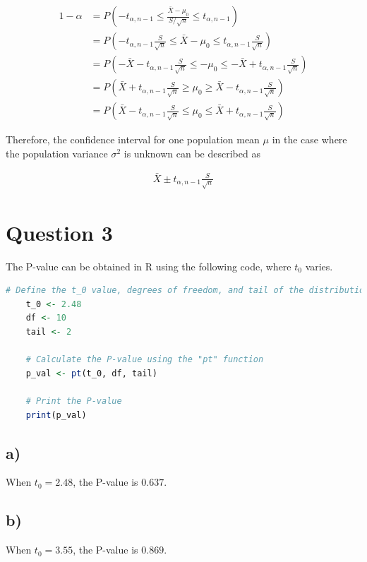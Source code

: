 \documentclass{article}
\begin{document}
\begin{align*}
    1 - \alpha &= P(-t_{\alpha,n-1} \leq \frac{\bar{X} - \mu_0}{S/\sqrt{n}} \leq t_{\alpha,n-1}) \\
                &= P(-t_{\alpha,n-1} \frac{S}{\sqrt{n}} \leq \bar{X} - \mu_0 \leq t_{\alpha,n-1} \frac{S}{\sqrt{n}}) \\
                &= P(-\bar{X} - t_{\alpha,n-1} \frac{S}{\sqrt{n}} \leq -\mu_0 \leq -\bar{X} + t_{\alpha,n-1} \frac{S}{\sqrt{n}}) \\
                &= P(\bar{X} + t_{\alpha,n-1} \frac{S}{\sqrt{n}} \geq \mu_0 \geq \bar{X} - t_{\alpha,n-1} \frac{S}{\sqrt{n}}) \\
                &= P(\bar{X} - t_{\alpha,n-1} \frac{S}{\sqrt{n}} \leq \mu_0 \leq \bar{X} + t_{\alpha,n-1} \frac{S}{\sqrt{n}})
    \end{align*}

Therefore, the confidence interval for one population mean $\mu$ in the case
where the population variance $\sigma ^{2}$ is unknown can be described as

\begin{align*}
    \bar{X} \pm t_{\alpha,n-1}\frac{S}{\sqrt{n}}
\end{align*}

\section*{Question 3}
The P-value can be obtained in R using the following code, where $t_0$ varies.
\begin{lstlisting}[language=R, caption=Calculating the P-value for a $t_0$ value, basicstyle=\small]
    # Define the t_0 value, degrees of freedom, and tail of the distribution
    t_0 <- 2.48
    df <- 10
    tail <- 2
    
    # Calculate the P-value using the "pt" function
    p_val <- pt(t_0, df, tail)
    
    # Print the P-value
    print(p_val)
    \end{lstlisting}

\subsection*{a)}
When $t_0 = 2.48$, the P-value is $0.637$.
\subsection*{b)}
When $t_0 = 3.55$, the P-value is $0.869$.
\end{document}
